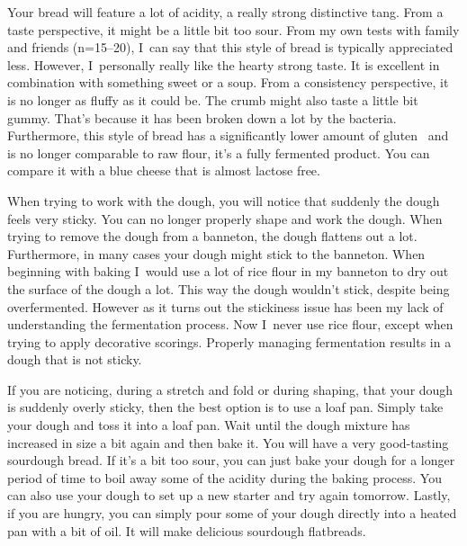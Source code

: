 Your bread will feature a lot of acidity, a really strong distinctive tang. From
a taste perspective, it might be a little bit too sour. From my own tests with family and
friends (n=15--20), I~can say that this style of bread is typically
appreciated less. However, I~personally really like the hearty strong taste.
It is excellent in combination with something
sweet or a soup.  From a consistency perspective, it is no longer as fluffy as it could be.
The crumb might also taste a little bit gummy. That's because it has been broken down a lot
by the bacteria. Furthermore, this style of bread has a significantly lower amount
of gluten~\cite{raffaella+di+cagno} and is no longer comparable to raw flour,
it's a fully fermented product.
You can compare it with a blue cheese that is almost lactose free.

When trying to work with the dough, you will notice that suddenly the dough feels
very sticky. You can no longer properly shape and work the dough. When trying to
remove the dough from a banneton, the dough flattens out a lot. Furthermore,
in many cases your dough might stick to the banneton. When beginning with baking
I~would use a lot of rice flour in my banneton to dry out the surface of the dough a lot.
This way the dough wouldn't stick, despite being overfermented. However as it
turns out the stickiness issue has been my lack of understanding the fermentation
process. Now I~never use rice flour, except when trying to apply decorative scorings.
Properly managing fermentation results in a dough that is not sticky.

If you are noticing, during a stretch and fold or during shaping, that your dough
is suddenly overly sticky, then the best option is to use a loaf pan. Simply take
your dough and toss it into a loaf pan. Wait until the dough mixture has increased
in size a bit again and then bake it. You will have a very good-tasting sourdough
bread. If it's a bit too sour, you can just bake your dough for a longer period
of time to boil away some of the acidity during the baking process. You can also use
your dough to set up a new starter and try again tomorrow. Lastly, if you are hungry,
you can simply pour some of your dough directly into a heated pan with a bit of
oil. It will make delicious sourdough flatbreads.

